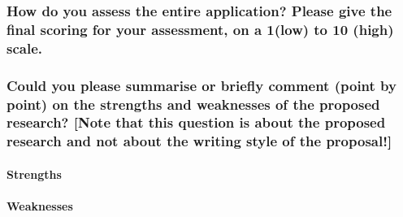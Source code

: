 \subsubsection*{How do you assess the entire application? Please give the final scoring for your assessment, on a 1(low) to 10 (high) scale.}

\subsubsection*{Could you please summarise or briefly comment (point by point) on the strengths and weaknesses of the proposed research? [Note that this question is about the proposed research and not about the writing style of the proposal!]}
\paragraph{Strengths}
\begin{itemize}
\end{itemize}

\paragraph{Weaknesses}
\begin{itemize}
\end{itemize}

